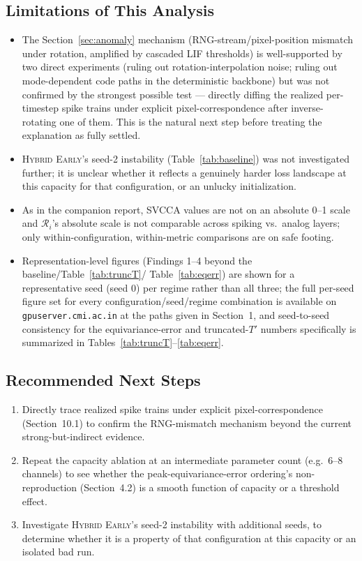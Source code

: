 \documentclass[11pt]{article}
\newcommand{\HybridEarly}{\textsc{Hybrid Early}}
\begin{document}
\subsection{Limitations of This Analysis}
\begin{itemize}[leftmargin=1.5em]
\item The Section~\ref{sec:anomaly} mechanism (RNG-stream/pixel-position mismatch under rotation,
amplified by cascaded LIF thresholds) is well-supported by two direct experiments (ruling out
rotation-interpolation noise; ruling out mode-dependent code paths in the deterministic backbone) but
was not confirmed by the strongest possible test --- directly diffing the realized per-timestep spike
trains under explicit pixel-correspondence after inverse-rotating one of them. This is the natural
next step before treating the explanation as fully settled.
\item \HybridEarly's seed-2 instability (Table~\ref{tab:baseline}) was not investigated further; it is
unclear whether it reflects a genuinely harder loss landscape at this capacity for that configuration,
or an unlucky initialization.
\item As in the companion report, SVCCA values are not on an absolute 0--1 scale and $\mathcal{R}_i$'s
absolute scale is not comparable across spiking vs.\ analog layers; only within-configuration,
within-metric comparisons are on safe footing.
\item Representation-level figures (Findings 1--4 beyond the baseline/Table~\ref{tab:truncT}/
Table~\ref{tab:eqerr}) are shown for a representative seed (seed 0) per regime rather than all three;
the full per-seed figure set for every configuration/seed/regime combination is available on
\texttt{gpuserver.cmi.ac.in} at the paths given in Section~1, and seed-to-seed consistency for the
equivariance-error and truncated-$T'$ numbers specifically is summarized in
Tables~\ref{tab:truncT}--\ref{tab:eqerr}.
\end{itemize}

\subsection{Recommended Next Steps}
\begin{enumerate}[leftmargin=1.5em]
\item Directly trace realized spike trains under explicit pixel-correspondence (Section~10.1) to
confirm the RNG-mismatch mechanism beyond the current strong-but-indirect evidence.
\item Repeat the capacity ablation at an intermediate parameter count (e.g.\ 6--8 channels) to see
whether the peak-equivariance-error ordering's non-reproduction (Section~4.2) is a smooth function of
capacity or a threshold effect.
\item Investigate \HybridEarly's seed-2 instability with additional seeds, to determine whether it is
a property of that configuration at this capacity or an isolated bad run.
\end{enumerate}
\end{document}
